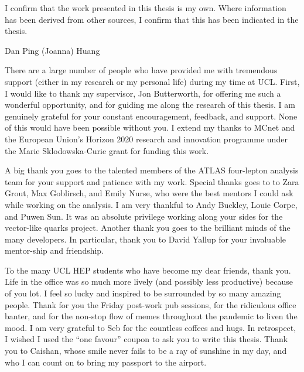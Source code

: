 \begin{declaration}
  I confirm that the work presented in this thesis is my own. Where information has been derived from other sources, I confirm that this has been indicated in the thesis.
  \vspace*{1cm}
  \begin{flushright}
    Dan Ping (Joanna) Huang
  \end{flushright}
\end{declaration}


\begin{acknowledgements}
    There are a large number of people who have provided me with tremendous support (either in my research or my personal life) during my time at UCL. First, I would like to thank my supervisor, Jon Butterworth, for offering me such a wonderful opportunity, and for guiding me along the research of this thesis. I am genuinely grateful for your constant encouragement, feedback, and support. None of this would have been possible without you. I extend my thanks to MCnet and the European Union’s Horizon 2020 research and innovation programme under the Marie Sklodowska-Curie grant for funding this work. 
    
    A big thank you goes to the talented members of the ATLAS four-lepton analysis team for your support and patience with my work. Special thanks goes to to Zara Grout, Max Goblirsch, and Emily Nurse, who were the best mentors I could ask while working on the analysis. I am very thankful to Andy Buckley, Louie Corpe, and Puwen Sun. It was an absolute privilege working along your sides for the vector-like quarks project. Another thank you goes to the brilliant minds of the many \contur developers. In particular, thank you to David Yallup for your invaluable mentor-ship and friendship. 
    
    To the many UCL HEP students who have become my dear friends, thank you. Life in the office was so much more lively (and possibly less productive) because of you lot. I feel so lucky and inspired to be surrounded by so many amazing people. Thank for you the Friday post-work pub sessions, for the ridiculous office banter, and for the non-stop flow of memes throughout the pandemic to liven the mood. I am very grateful to Seb for the countless coffees and hugs. In retrospect, I wished I used the “one favour” coupon to ask you to write this thesis. Thank you to Caishan, whose smile never fails to be a ray of sunshine in my day, and who I can count on to bring my passport to the airport.
    

\end{acknowledgements}

